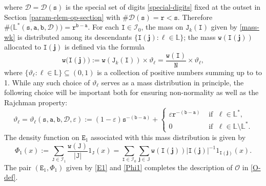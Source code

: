\documentclass[12pt, twoside]{article}
\theoremstyle{definition}
\numberwithin{equation}{section}
\begin{document}
where $\mathscr{D} = \mathscr{D}(\mathtt s)$ is the special set of digits \eqref{special-digits} fixed at the outset in Section \ref{param-elem-op-section} with $\# \mathscr{D} (\mathtt s) = \mathtt r < \mathtt s$. Therefore $\#\bigl(\mathbb L^{\ast}(\mathtt s, \mathtt a, \mathtt b, \mathscr{D}) \bigr) = {\mathtt r}^{\mathtt b - \mathtt a}$. 
\vskip0.1in
\noindent For each $\mathtt I \in \mathscr{I}_0$, the mass on $\mathtt J_k(\mathtt I)$ given by \eqref{mass-wk} is distributed among its descendants $\{\mathtt I(\mathbf j) : \ell \in \mathbb L\}$; the mass $\mathtt w(\mathtt I(\mathbf j))$ allocated to $\mathtt I(\mathbf j)$ is defined via the formula 
\begin{equation} 
\mathtt w\bigl(\mathtt I(\mathbf j) \bigr) := \mathtt w(\mathtt J_k(\mathtt I)) \times \vartheta_{\ell}  =  \frac{\mathtt w(\mathtt I)}{\mathtt N} \times \vartheta_{\ell}, \label{second-step-weight} 
\end{equation} 
where $\bigl\{\vartheta_{\ell} : \ell \in \mathbb L \bigr\} \subseteq (0,1)$ is a collection of positive numbers summing up to to 1. While any such choice of $\vartheta_{\ell}$ serves as a mass distribution in principle, the following choice will be important both for ensuring non-normality as well as the Rajchman property:
\begin{equation} \label{choice-of-theta}  
\vartheta_{\ell} = \vartheta_{\ell}(\mathtt s, \mathtt a, \mathtt b, \mathscr{D}, \varepsilon) :=  (1 - \varepsilon) \mathtt s^{-(\mathtt b - \mathtt a)} + \begin{cases} \varepsilon  \mathtt r^{-(\mathtt b - \mathtt a)} &\text{ if } \; \ell \in \mathbb L^{\ast}, \\ 0 &\text{ if } \; \ell \in \mathbb L \setminus \mathbb L^{\ast}.  \end{cases} 
\end{equation} 
The density function on $\mathtt E_1$ associated with this mass distribution is given by 
\begin{equation} \label{Phi1} 
\Phi_1(x) := \sum_{\mathtt J \in \mathscr{I}_1} \frac{\mathtt w(\mathtt J)}{|\mathtt J|} 1_{\mathtt J}(x) = \sum_{\mathtt I \in \mathscr{I}_0} \sum_{\mathbf j \in \mathbb J} \mathtt w(\mathtt I(\mathbf j)) |\mathtt I(\mathbf j)|^{-1} 1_{\mathtt I(\mathbf j)}(x). 
\end{equation} 
The pair $(\mathtt E_1, \Phi_1)$ given by \eqref{E1} and \eqref{Phi1} completes the description of $\mathscr{O}$ in \eqref{O-def}. 
\end{document}
